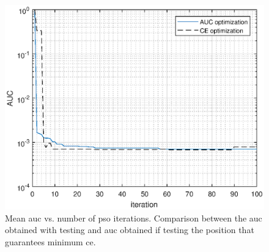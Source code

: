 \documentclass[twocolumns]{IEEEtran}
\begin{document}
\begin{figure}[t]
    \centering
    \includegraphics[width=1\columnwidth]{CE_vsAUC.eps}
    \caption{Mean \ac{auc} vs. number of \ac{pso} iterations. Comparison between the \ac{auc} obtained with testing and \ac{auc} obtained if testing the position that guarantees minimum \ac{ce}.}
    \label{fig:CEvsAUC}
\end{figure}


\renewcommand*{\bibfont}{\footnotesize}

\printbibliography
\balance
\end{document}
